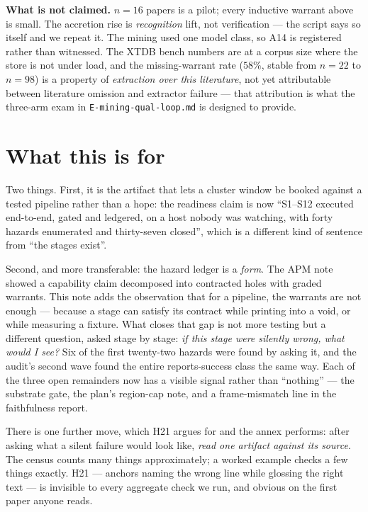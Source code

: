\documentclass[11pt]{article}
\newcommand{\hz}[1]{\textsf{#1}}
\begin{document}
\textbf{What is not claimed.} $n{=}16$ papers is a pilot; every
inductive warrant above is small. The accretion rise is \emph{recognition}
lift, not verification --- the script says so itself and we repeat it. The
mining used one model class, so A14 is registered rather than witnessed. The
XTDB bench numbers are at a corpus size where the store is not under load, and
the missing-warrant rate ($58\%$, stable from $n{=}22$ to $n{=}98$) is a
property of \emph{extraction over this literature}, not yet attributable
between literature omission and extractor failure --- that attribution is what
the three-arm exam in \texttt{E-mining-qual-loop.md} is designed to provide.

\section{What this is for}

Two things. First, it is the artifact that lets a cluster window be booked
against a tested pipeline rather than a hope: the readiness claim is now
``S1--S12 executed end-to-end, gated and ledgered, on a host nobody was
watching, with forty hazards enumerated and thirty-seven closed'', which is a
different kind of sentence from ``the stages exist''.

Second, and more transferable: the hazard ledger is a \emph{form}. The APM note
showed a capability claim decomposed into contracted holes with graded
warrants. This note adds the observation that for a pipeline, the warrants are
not enough --- because a stage can satisfy its contract while printing into a
void, or while measuring a fixture. What closes that gap is not more testing
but a different question, asked stage by stage: \emph{if this stage were
silently wrong, what would I see?} Six of the first twenty-two hazards were
found by asking it, and the audit's second wave found the entire
reports-success class the same way. Each of the three open remainders now has
a visible signal rather than ``nothing'' --- the substrate gate, the plan's
region-cap note, and a frame-mismatch line in the faithfulness report.

There is one further move, which \hz{H21} argues for and the annex performs:
after asking what a silent failure would look like, \emph{read one artifact
against its source}. The census counts many things approximately; a worked
example checks a few things exactly. \hz{H21} --- anchors naming the wrong line
while glossing the right text --- is invisible to every aggregate check we run,
and obvious on the first paper anyone reads.
\end{document}
